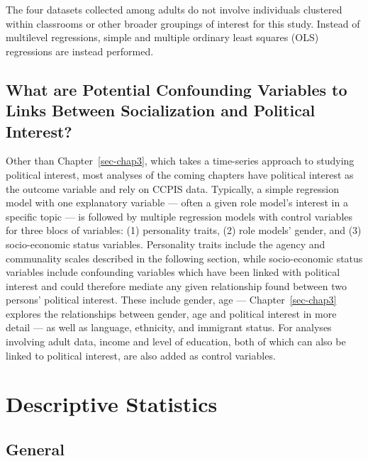 \documentclass[
  letterpaper,
  DIV=11,
  numbers=noendperiod]{scrreprt}
\begin{document}
The four datasets collected among adults do not involve individuals
clustered within classrooms or other broader groupings of interest for
this study. Instead of multilevel regressions, simple and multiple
ordinary least squares (OLS) regressions are instead performed.

\hypertarget{what-are-potential-confounding-variables-to-links-between-socialization-and-political-interest}{%
\subsection{What are Potential Confounding Variables to Links Between
Socialization and Political
Interest?}\label{what-are-potential-confounding-variables-to-links-between-socialization-and-political-interest}}

Other than Chapter~\ref{sec-chap3}, which takes a time-series approach
to studying political interest, most analyses of the coming chapters
have political interest as the outcome variable and rely on CCPIS data.
Typically, a simple regression model with one explanatory variable ---
often a given role model's interest in a specific topic --- is followed
by multiple regression models with control variables for three blocs of
variables: (1) personality traits, (2) role models' gender, and (3)
socio-economic status variables. Personality traits include the agency
and communality scales described in the following section, while
socio-economic status variables include confounding variables which have
been linked with political interest and could therefore mediate any
given relationship found between two persons' political interest. These
include gender, age --- Chapter~\ref{sec-chap3} explores the
relationships between gender, age and political interest in more detail
--- as well as language, ethnicity, and immigrant status. For analyses
involving adult data, income and level of education, both of which can
also be linked to political interest, are also added as control
variables.

\hypertarget{descriptive-statistics}{%
\section{Descriptive Statistics}\label{descriptive-statistics}}

\hypertarget{general}{%
\subsection{General}\label{general}}
\end{document}
